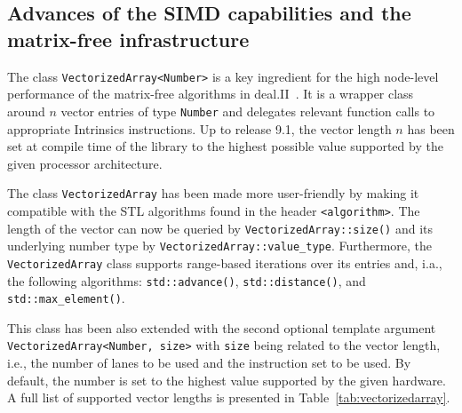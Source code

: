 \documentclass{ansarticle-preprint}
\begin{document}


\subsection{Advances of the SIMD capabilities and the matrix-free infrastructure}
\label{subsec:mf}


The class \texttt{VectorizedArray<Number>} is a key ingredient for the high 
node-level performance of the matrix-free algorithms in deal.II~\cite{KronbichlerKormann2012, KronbichlerKormann2019}. It is a wrapper 
class around $n$ vector entries of type \texttt{Number} and delegates relevant 
function calls to appropriate Intrinsics instructions. Up to release 9.1, the 
vector length $n$ has been set at compile time of the library to the highest 
possible value supported by the given processor architecture.

The class \texttt{VectorizedArray} has been made more user-friendly by making 
it compatible with the STL algorithms found in the header \texttt{<algorithm>}. 
The length of the  vector can now be queried by  \texttt{VectorizedArray::size()} and its underlying number type by \texttt{VectorizedArray::value\_type}. 
Furthermore, the \texttt{VectorizedArray} class supports range-based iterations over its entries and, i.a., the following 
algorithms: \texttt{std::\allowbreak ad\-vance()}, \texttt{std::distance()}, and \texttt{std::max\_element()}.

This class has been also extended with the second optional template argument 
\texttt{VectorizedArray<Number, size>} with \texttt{size} being related to the 
vector length, i.e., the number of lanes to be used and the instruction set to be 
used. By default, the number is set to the highest value supported by the given 
hardware. A full list of supported 
vector lengths is presented in Table~\ref{tab:vectorizedarray}.
\end{document}
